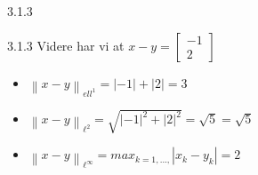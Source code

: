 \documentclass[a4paper,norsk]{article}
\begin{document}
\begin{oppgavebox}{3.1.3}{}
\begin{proofbox}{3.1.3}{}
Videre har vi at $ x- y = \begin{bmatrix}
    -1\\2
\end{bmatrix}  $ 

\begin{itemize}
    \item $ \left\lVert x-y \right\rVert _{ell^1}  = \left| -1 \right| + \left| 2 \right| =3$
    \item $ \left\lVert x-y \right\rVert _{\ell^2} = \sqrt{ \left| -1 \right| ^2 + \left| 2 \right| ^2 } = \sqrt{ 5 } = \sqrt{ 5 } $
    \item $ \left\lVert x-y \right\rVert _{\ell^{\infty}} = max_{k=1, ... ,} \left| x_k - y_k \right|  = 2 $ 
\end{itemize}
\end{proofbox}
\end{oppgavebox}
\end{document}
